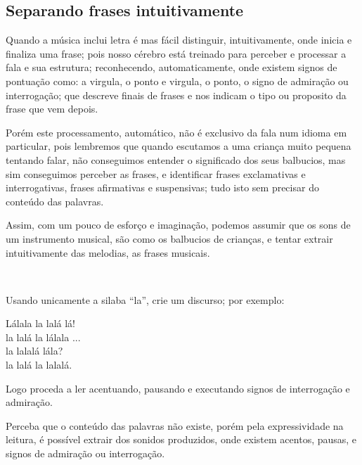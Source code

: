 \subsection{Separando frases intuitivamente}

Quando a música inclui letra é mas fácil distinguir, intuitivamente, 
onde inicia e finaliza uma frase;
pois nosso cérebro está treinado para perceber e processar a fala e sua estrutura;
reconhecendo, automaticamente,
onde existem signos de pontuação como:
a virgula, o ponto e virgula, o ponto, o signo de admiração ou interrogação;
que descreve finais de frases e nos indicam o tipo ou proposito da frase que vem depois.

Porém este processamento, automático, não é exclusivo da fala num idioma em particular,
pois lembremos que quando escutamos a uma criança muito pequena tentando falar,
não conseguimos entender o significado dos seus balbucios, 
mas sim conseguimos perceber as frases, 
e identificar frases exclamativas e interrogativas,
frases afirmativas e suspensivas;
tudo isto sem precisar do conteúdo das palavras.

Assim, com um pouco de esforço e imaginação,
podemos assumir que os sons de um instrumento musical, 
são como os balbucios de crianças, e tentar extrair intuitivamente das melodias,
as frases musicais. 
 
~

\begin{example}[O discurso de ``la'']
\label{ex:discrusodela}
Usando unicamente a silaba ``la'', crie um discurso; por exemplo:
\begin{citando}%
Lálala la lalá lá!\\
la lalá la lálala ...\\
la lalalá lála?\\
la lalá la lalalá.\\
\end{citando}%
Logo proceda a ler acentuando, pausando e
executando signos de interrogação e admiração.

Perceba que o conteúdo das palavras não existe, 
porém pela expressividade na leitura,
é possível extrair dos sonidos produzidos,
onde existem acentos, pausas, e signos de admiração ou interrogação.
\end{example}

